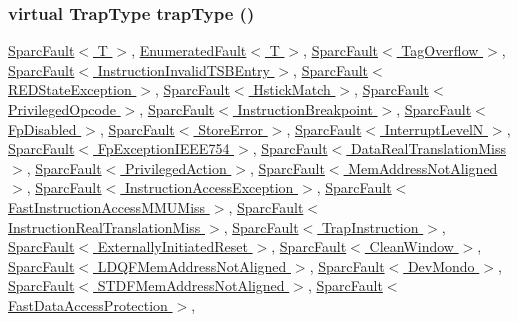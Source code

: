 {\subsubsection[{trapType}]{\setlength{\rightskip}{0pt plus 5cm}virtual {\bf TrapType} trapType ()}}
\label{classSparcISA_1_1SparcFaultBase_a0950271648d599cac74123f9626ef7d2}


\hyperlink{classSparcISA_1_1SparcFault_aa059963bc65ed73d2d744374cd6da5b1}{SparcFault$<$ T $>$}, \hyperlink{classSparcISA_1_1EnumeratedFault_aa059963bc65ed73d2d744374cd6da5b1}{EnumeratedFault$<$ T $>$}, \hyperlink{classSparcISA_1_1SparcFault_aa059963bc65ed73d2d744374cd6da5b1}{SparcFault$<$ TagOverflow $>$}, \hyperlink{classSparcISA_1_1SparcFault_aa059963bc65ed73d2d744374cd6da5b1}{SparcFault$<$ InstructionInvalidTSBEntry $>$}, \hyperlink{classSparcISA_1_1SparcFault_aa059963bc65ed73d2d744374cd6da5b1}{SparcFault$<$ REDStateException $>$}, \hyperlink{classSparcISA_1_1SparcFault_aa059963bc65ed73d2d744374cd6da5b1}{SparcFault$<$ HstickMatch $>$}, \hyperlink{classSparcISA_1_1SparcFault_aa059963bc65ed73d2d744374cd6da5b1}{SparcFault$<$ PrivilegedOpcode $>$}, \hyperlink{classSparcISA_1_1SparcFault_aa059963bc65ed73d2d744374cd6da5b1}{SparcFault$<$ InstructionBreakpoint $>$}, \hyperlink{classSparcISA_1_1SparcFault_aa059963bc65ed73d2d744374cd6da5b1}{SparcFault$<$ FpDisabled $>$}, \hyperlink{classSparcISA_1_1SparcFault_aa059963bc65ed73d2d744374cd6da5b1}{SparcFault$<$ StoreError $>$}, \hyperlink{classSparcISA_1_1SparcFault_aa059963bc65ed73d2d744374cd6da5b1}{SparcFault$<$ InterruptLevelN $>$}, \hyperlink{classSparcISA_1_1SparcFault_aa059963bc65ed73d2d744374cd6da5b1}{SparcFault$<$ FpExceptionIEEE754 $>$}, \hyperlink{classSparcISA_1_1SparcFault_aa059963bc65ed73d2d744374cd6da5b1}{SparcFault$<$ DataRealTranslationMiss $>$}, \hyperlink{classSparcISA_1_1SparcFault_aa059963bc65ed73d2d744374cd6da5b1}{SparcFault$<$ PrivilegedAction $>$}, \hyperlink{classSparcISA_1_1SparcFault_aa059963bc65ed73d2d744374cd6da5b1}{SparcFault$<$ MemAddressNotAligned $>$}, \hyperlink{classSparcISA_1_1SparcFault_aa059963bc65ed73d2d744374cd6da5b1}{SparcFault$<$ InstructionAccessException $>$}, \hyperlink{classSparcISA_1_1SparcFault_aa059963bc65ed73d2d744374cd6da5b1}{SparcFault$<$ FastInstructionAccessMMUMiss $>$}, \hyperlink{classSparcISA_1_1SparcFault_aa059963bc65ed73d2d744374cd6da5b1}{SparcFault$<$ InstructionRealTranslationMiss $>$}, \hyperlink{classSparcISA_1_1SparcFault_aa059963bc65ed73d2d744374cd6da5b1}{SparcFault$<$ TrapInstruction $>$}, \hyperlink{classSparcISA_1_1SparcFault_aa059963bc65ed73d2d744374cd6da5b1}{SparcFault$<$ ExternallyInitiatedReset $>$}, \hyperlink{classSparcISA_1_1SparcFault_aa059963bc65ed73d2d744374cd6da5b1}{SparcFault$<$ CleanWindow $>$}, \hyperlink{classSparcISA_1_1SparcFault_aa059963bc65ed73d2d744374cd6da5b1}{SparcFault$<$ LDQFMemAddressNotAligned $>$}, \hyperlink{classSparcISA_1_1SparcFault_aa059963bc65ed73d2d744374cd6da5b1}{SparcFault$<$ DevMondo $>$}, \hyperlink{classSparcISA_1_1SparcFault_aa059963bc65ed73d2d744374cd6da5b1}{SparcFault$<$ STDFMemAddressNotAligned $>$}, \hyperlink{classSparcISA_1_1SparcFault_aa059963bc65ed73d2d744374cd6da5b1}{SparcFault$<$ FastDataAccessProtection $>$}, 